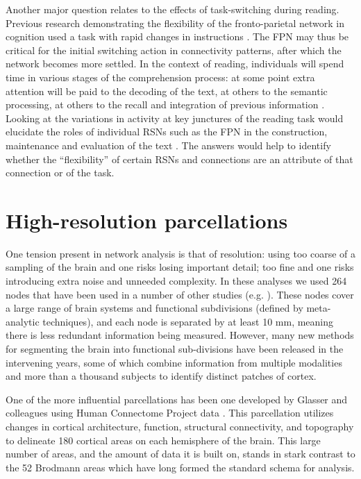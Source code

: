 Another major question relates to the effects of task-switching during reading. Previous research demonstrating the flexibility of the fronto-parietal network in cognition used a task with rapid changes in instructions \citep{Cole2013}. The FPN may thus be critical for the initial switching action in connectivity patterns, after which the network becomes more settled. In the context of reading, individuals will spend time in various stages of the comprehension process: at some point extra attention will be paid to the decoding of the text, at others to the semantic processing, at others to the recall and integration of previous information \citep{Spreng2013}. Looking at the variations in activity at key junctures of the reading task would elucidate the roles of individual RSNs such as the FPN in the construction, maintenance and evaluation of the text \citep{Sakai2008}. The answers would help to identify whether the ``flexibility'' of certain RSNs and connections are an attribute of that connection or of the task.

\section{High-resolution parcellations}

One tension present in network analysis is that of resolution: using too coarse of a sampling of the brain and one risks losing important detail; too fine and one risks introducing extra noise and unneeded complexity. In these analyses we used 264 nodes that have been used in a number of other studies (e.g. \citep{Power2013, Cole2014}). These nodes cover a large range of brain systems and functional subdivisions (defined by meta-analytic techniques), and each node is separated by at least 10 mm, meaning there is less redundant information being measured. However, many new methods for segmenting the brain into functional sub-divisions have been released in the intervening years, some of which combine information from multiple modalities and more than a thousand subjects to identify distinct patches of cortex. 

One of the more influential parcellations has been one developed by Glasser and colleagues using Human Connectome Project data \citep{Glasser2016}. This parcellation utilizes changes in cortical architecture, function, structural connectivity, and topography to delineate 180 cortical areas on each hemisphere of the brain. This large number of areas, and the amount of data it is built on, stands in stark contrast to the 52 Brodmann areas which have long formed the standard schema for analysis. 

